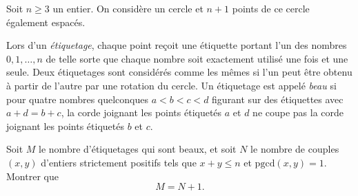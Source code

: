 Soit $n \geq 3$ un entier. On considère un cercle et $n + 1$ points de ce cercle également espacés.

Lors d'un \emph{étiquetage}, chaque point reçoit une étiquette portant l'un des nombres $0, 1, \ldots, n$ de
telle sorte que chaque nombre soit exactement utilisé une fois et une seule. Deux étiquetages sont considérés
comme les mêmes si l'un peut être obtenu à partir de l'autre par une rotation du cercle. Un étiquetage est
appelé \emph{beau} si pour quatre nombres quelconques $a < b < c < d$ figurant sur des étiquettes avec
$a + d = b + c$, la corde joignant les points étiquetés $a$ et $d$ ne coupe pas la corde joignant les points
étiquetés $b$ et $c$.

Soit $M$ le nombre d'étiquetages qui sont beaux, et soit $N$ le nombre de couples $(x, y)$ d'entiers
strictement positifs tels que $x + y \leq n$ et $\mathrm{pgcd}(x, y) = 1$. Montrer que
\[
M = N + 1.
\]
